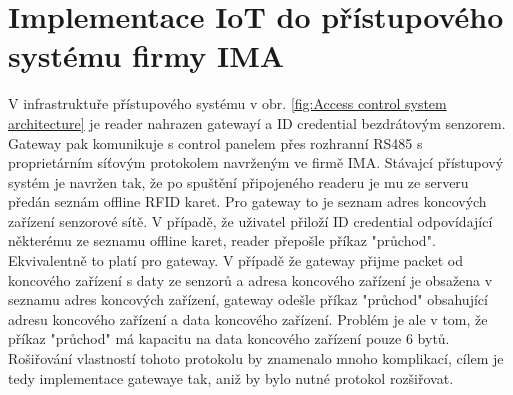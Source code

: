 \section{Implementace IoT do přístupového systému firmy IMA}
\label{sec:Implementace IoT do přístupového systému firmy IMA}
V infrastruktuře přístupového systému v obr. \ref{fig:Access control system architecture} je reader nahrazen gatewayí a ID credential bezdrátovým senzorem. 
Gateway pak komunikuje s control panelem přes rozhranní RS485 s proprietárním síťovým protokolem navrženým ve firmě IMA. 
Stávajcí přístupový systém je navržen tak, že po spuštění připojeného readeru je mu ze serveru předán seznám offline RFID karet. 
Pro gateway to je seznam adres koncových zařízení senzorové sítě. 
V případě, že uživatel přiloží ID credential odpovídající některému ze seznamu offline karet, reader přepošle příkaz "průchod".
Ekvivalentně to platí pro gateway. 
V případě že gateway přijme packet od koncového zařízení s daty ze senzorů a adresa koncového zařízení je obsažena v seznamu adres koncových zařízení,
gateway odešle příkaz "průchod" obsahující adresu koncového zařízení a data koncového zařízení.
Problém je ale v tom, že příkaz "průchod" má kapacitu na data koncového zařízení pouze 6 bytů.
Rošiřování vlastností tohoto protokolu by znamenalo mnoho komplikací, 
cílem je tedy implementace gatewaye tak, aniž by bylo nutné protokol rozšiřovat.


